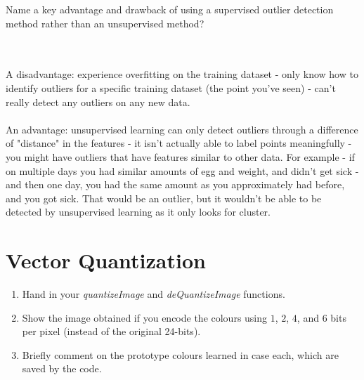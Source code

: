 \documentclass{article}
\def\blu#1{{\color{blu}#1}}
\def\enum#1{\begin{enumerate}#1\end{enumerate}}
\begin{document}
{\blu{\item Name a key advantage and drawback of using a supervised outlier detection method rather than an unsupervised method?} \\\\ A disadvantage: experience overfitting on the training dataset - only know how to identify outliers for a specific training dataset (the point you've seen) - can't really detect any outliers on any new data. \\\\ An advantage: unsupervised learning can only detect outliers through a difference of "distance" in the features - it isn't actually able to label points meaningfully - you might have outliers that have features similar to other data. For example - if on multiple days you had similar amounts of egg and weight, and didn't get sick - and then one day, you had the same amount as you approximately had before, and you got sick. That would be an outlier, but it wouldn't be able to be detected by unsupervised learning as it only looks for cluster.
}



\section{Vector Quantization}

\blu{\enum{
\item Hand in your \emph{quantizeImage} and \emph{deQuantizeImage} functions.
\item Show the image obtained if you encode the colours using $1$, $2$, $4$, and $6$ bits per pixel (instead of the original 24-bits).
\item Briefly comment on the prototype colours learned in case each, which are saved by the code.
}}
\end{document}
